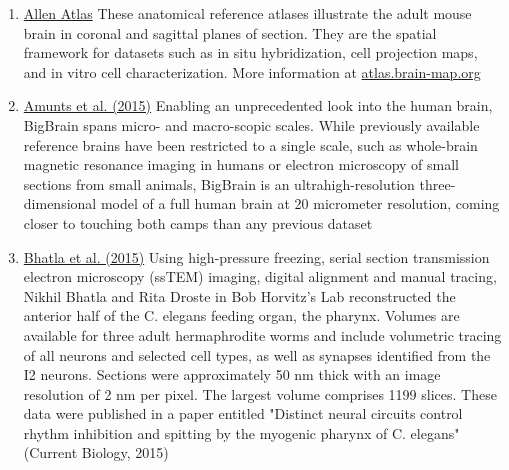 \documentclass[10pt,colorlinks=true,urlcolor=blue]{moderncv}
\begin{document}
\begin{enumerate}
    \item \href{https://neurodata.io/data/allen_atlas}{Allen Atlas}
        These anatomical reference atlases illustrate the adult mouse brain in coronal and sagittal planes of section. They are the spatial framework for datasets such as in situ hybridization, cell projection maps, and in vitro cell characterization. More information at \href{http://atlas.brain-map.org/}{atlas.brain-map.org} 
    
    \item \href{https://neurodata.io/data/bigbrain}{Amunts et al. (2015)} 
        Enabling an unprecedented look into the human brain, BigBrain spans micro- and macro-scopic scales. While previously available reference brains have been restricted to a single scale, such as whole-brain magnetic resonance imaging in humans or electron microscopy of small sections from small animals, BigBrain is an ultrahigh-resolution three-dimensional model of a full human brain at 20 micrometer resolution, coming closer to touching both camps than any previous dataset%

    \item \href{https://neurodata.io/data/bhatla15}{Bhatla et al. (2015)} 
        Using high-pressure freezing, serial section transmission electron microscopy (ssTEM) imaging, digital alignment and manual tracing, Nikhil Bhatla and Rita Droste in Bob Horvitz's Lab reconstructed the anterior half of the C. elegans feeding organ, the pharynx. Volumes are available for three adult hermaphrodite worms and include volumetric tracing of all neurons and selected cell types, as well as synapses identified from the I2 neurons. Sections were approximately 50 nm thick with an image resolution of 2 nm per pixel. The largest volume comprises 1199 slices. These data were published in a paper entitled "Distinct neural circuits control rhythm inhibition and spitting by the myogenic pharynx of C. elegans" (Current Biology, 2015)%


\end{enumerate}
\end{document}
